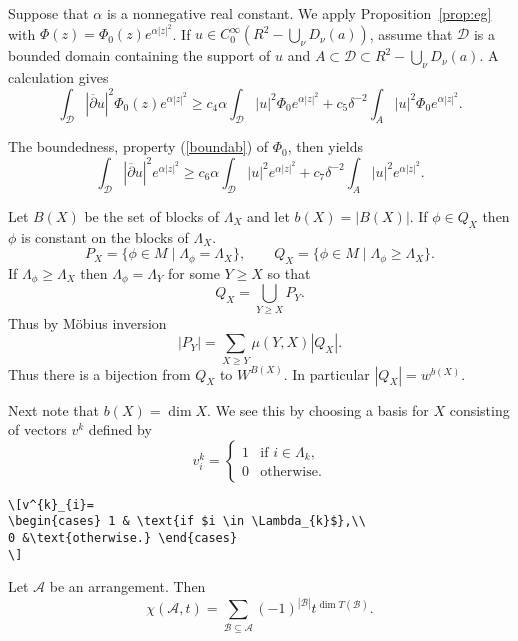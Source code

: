 \documentclass[mlq,fleqn]{w-art}
\newcommand{\A}{\mathcal{A}}
\newcommand{\B}{\mathcal{B}}
\newcommand{\envert}[1]{\left\lvert#1\right\rvert}
\let\abs=\envert
\begin{document}
Suppose that $\alpha$ is a nonnegative real constant. We apply
Proposition~\ref{prop:eg} with $\Phi(z)=\Phi_ 0(z) e^{\alpha\abs{z}^2}$. If
$u\in C^\infty_0(R^2-\bigcup_\nu D_\nu(a))$, assume that $\mathcal{D}$
is a bounded domain containing the support of $u$ and $A\subset
\mathcal{D}\subset R^2-\bigcup_\nu D_\nu(a)$. A calculation gives
\[\int_{\mathcal{D}}\abs{\overline\partial u}^2\Phi_ 0(z) e^{\alpha\abs{z}^2}
\geq c_4\alpha\int_{\mathcal{D}}\abs{u}^2\Phi_ 0e^{\alpha\abs{z}^2}
+c_5\delta^{-2}\int_ A\abs{u}^2\Phi_ 0e^{\alpha\abs{z}^2}.\]

The boundedness, property (\ref{boundab}) of $\Phi_ 0$, then yields
\[\int_{\mathcal{D}}\abs{\overline\partial u}^2e^{\alpha\abs{z}^2}\geq c_6\alpha
\int_{\mathcal{D}}\abs{u}^2e^{\alpha\abs{z}^2}
+c_7\delta^{-2}\int_ A\abs{u}^2e^{\alpha\abs{z}^2}.\]

Let $B(X)$ be the set of blocks of $\Lambda_{X}$
and let $b(X) = \abs{B(X)}$. If $\phi \in Q_{X}$ then
$\phi$ is constant on the blocks of $\Lambda_{X}$.
\begin{equation}\label{far-d}
 P_{X} = \{ \phi \in M \mid \Lambda_{\phi} = \Lambda_{X} \},
\qquad
Q_{X} = \{\phi \in M \mid \Lambda_{\phi} \geq \Lambda_{X} \}.
\end{equation}
If $\Lambda_{\phi} \geq \Lambda_{X}$ then
$\Lambda_{\phi} = \Lambda_{Y}$ for some $Y \geq X$ so that
\[ Q_{X} = \bigcup_{Y \geq X} P_{Y}. \]
Thus by M\"obius inversion
\[ \abs{P_{Y}}= \sum_{X\geq Y} \mu (Y,X)\abs{Q_{X}}.\]
Thus there is a bijection from $Q_{X}$ to $W^{B(X)}$.
In particular $\abs{Q_{X}} = w^{b(X)}$.

Next note that $b(X)=\dim X$. We see this by choosing a
basis for $X$ consisting of vectors $v^{k}$ defined by
\[v^{k}_{i}=
\begin{cases} 1 & \text{if $i \in \Lambda_{k}$},\\
0 &\text{otherwise.} \end{cases}
\]
\begin{verbatim}
\[v^{k}_{i}=
\begin{cases} 1 & \text{if $i \in \Lambda_{k}$},\\
0 &\text{otherwise.} \end{cases}
\]
\end{verbatim}

\begin{lem}\label{p0201}
Let $\A$ be an arrangement. Then
\[ \chi (\A,t) = \sum_{\B \subseteq \A}
(-1)^{\abs{\B}} t^{\dim T(\B)}. \]
\end{lem}
\end{document}

